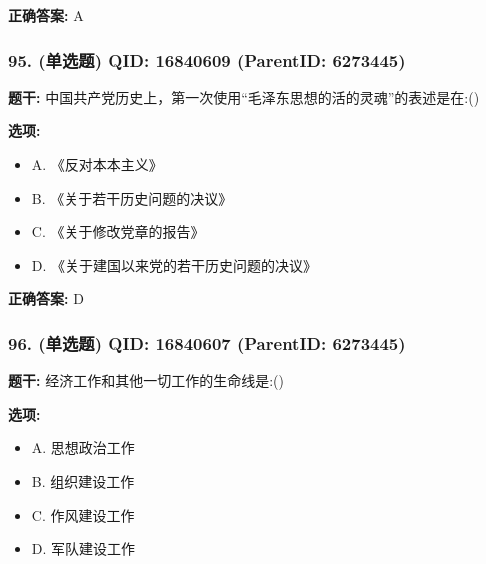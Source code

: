 \documentclass[12pt,UTF8]{ctexart}
\begin{document}
\textbf{正确答案:}
A

\vspace{0.3em}\hrulefill\vspace{0.7em}

\subsubsection*{95. (单选题) \small QID: 16840609 (ParentID: 6273445)}

\textbf{题干:}
中国共产党历史上，第一次使用“毛泽东思想的活的灵魂”的表述是在:()



\textbf{选项:}
\begin{itemize}[leftmargin=*]

  \item A. 《反对本本主义》

  \item B. 《关于若干历史问题的决议》

  \item C. 《关于修改党章的报告》

  \item D. 《关于建国以来党的若干历史问题的决议》

\end{itemize}

\textbf{正确答案:}
D

\vspace{0.3em}\hrulefill\vspace{0.7em}

\subsubsection*{96. (单选题) \small QID: 16840607 (ParentID: 6273445)}

\textbf{题干:}
经济工作和其他一切工作的生命线是:()



\textbf{选项:}
\begin{itemize}[leftmargin=*]

  \item A. 思想政治工作

  \item B. 组织建设工作

  \item C. 作风建设工作

  \item D. 军队建设工作

\end{itemize}
\end{document}
